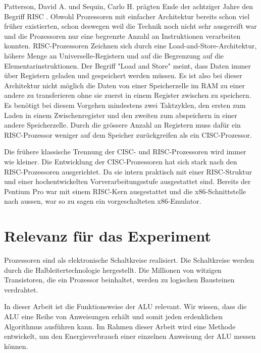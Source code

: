 Patterson, David A. und Sequin, Carlo H. prägten Ende der achtziger Jahre den Begriff RISC \cite{Patterson:1981:RIR:800052.801895}. Obwohl Prozessoren mit einfacher Architektur bereits schon viel früher existierten, schon deswegen weil die Technik noch nicht sehr ausgereift war und die Prozessoren nur eine begrenzte Anzahl an Instruktionen verarbeiten konnten. RISC-Prozessoren Zeichnen sich durch eine Load-and-Store-Architektur, höhere Menge an Universelle-Registern und auf die Begrenzung auf die Elementarinstruktionen. Der Begriff "Load and Store" meint, dass Daten immer über Registern geladen und gespeichert werden müssen. Es ist also bei dieser Architektur nicht möglich die Daten von einer Speicherzelle im RAM zu einer andere zu transferieren ohne sie zuerst in einem Register zwischen zu speichern. Es benötigt bei diesem Vorgehen mindestens zwei Taktzyklen, den ersten zum Laden in einem Zwischenregister und den zweiten zum abspeichern in einer andere Speicherzelle. Durch die grössere Anzahl an Registern muss dafür ein RISC-Prozessor weniger auf dem Speicher zurückgreifen als ein CISC-Prozessor.
\par
Die frühere klassische Trennung der CISC- und RISC-Prozessoren wird immer wie kleiner. Die Entwicklung der CISC-Prozessoren hat sich stark nach den RISC-Prozessoren ausgerichtet. Da sie intern praktisch mit einer RISC-Struktur und einer hochentwickelten Vorverarbeitungsstufe ausgestattet sind. Bereits der Pentium Pro war mit einem RISC-Kern ausgestattet und die x86-Schnittstelle nach aussen, war so zu sagen ein vorgeschalteten x86-Emulator.






\section{Relevanz für das Experiment}

Prozessoren sind als elektronische Schaltkreise realisiert. Die Schaltkreise werden durch die Halbleitertechnologie hergestellt. Die Millionen von witzigen Transistoren, die ein Prozessor beinhaltet, werden zu logischen Bausteinen verdrahtet.
\par
In dieser Arbeit ist die Funktionsweise der ALU relevant. Wir wissen, dass die ALU eine Reihe von Anweisungen erhält und somit jeden erdenklichen Algorithmus ausführen kann. Im Rahmen dieser Arbeit wird eine Methode entwickelt, um den Energieverbrauch einer einzelnen Anweisung der ALU messen können.



